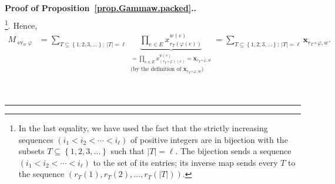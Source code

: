 \documentclass[numbers=enddot,12pt,final,onecolumn,notitlepage,abstracton]{scrartcl}%
\theoremstyle{definition}
\newenvironment{proof}[1][Proof]{\noindent\textbf{#1.} }{\ \rule{0.5em}{0.5em}}
\let\sumnonlimits\sum
\let\prodnonlimits\prod
\renewcommand{\sum}{\sumnonlimits\limits}
\renewcommand{\prod}{\prodnonlimits\limits}
\newcommand{\xx}{{\mathbf{x}}}
\newcommand{\ev}{\operatorname{ev}}
\begin{document}
\begin{proof}[Proof of Proposition~\ref{prop.Gammaw.packed}.]
\begin{align}
\nonumber
\end{align}
\footnote{In the last equality, we have used the fact that
the strictly increasing sequences
$\left(i_1 < i_2 < \cdots < i_\ell\right)$ of positive integers are
in bijection with the subsets
$T \subseteq \left\{1, 2, 3, \ldots\right\}$
such that $\left|T\right| = \ell$. The bijection sends a sequence
$\left(i_1 < i_2 < \cdots < i_\ell\right)$ to the set of its entries;
its inverse map sends every $T$ to the sequence
$\left(r_T\left(1\right), r_T\left(2\right), \ldots,
r_T\left(\left|T\right|\right)\right)$.}. Hence,
\begin{align}
M_{\ev_w \varphi}
&= \sum_{T \subseteq \left\{1, 2, 3, \ldots\right\} ; \ \left|T\right| = \ell}
\underbrace{\prod_{e \in E} x_{r_T\left(\varphi\left(e\right)\right)}^{w\left(e\right)}}
           _{\substack{
              = \prod_{e \in E} x_{\left(r_T\circ \varphi\right)\left(e\right)}^{w\left(e\right)}
              = \xx_{r_T\circ\varphi,w} \\
              \text{(by the definition of } \xx_{r_T\circ\varphi,w} \text{)}
             }}
= \sum_{T \subseteq \left\{1, 2, 3, \ldots\right\} ; \ \left|T\right| = \ell}
\xx_{r_T\circ\varphi,w} .
\label{pf.prop.Gammaw.packed.1.pf.1}
\end{align}


\end{proof}
\end{document}
